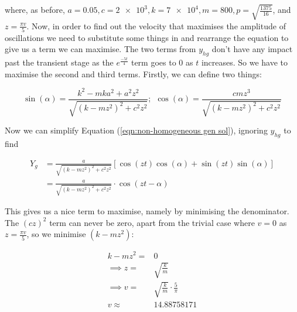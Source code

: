 \documentclass[12pt]{article}
\begin{document}
\begin{enumerate}
        where, as before, $a=0.05, c=\num{2e3}, k=\num{7e4}, m=800, p=\sqrt{\frac{1375}{16}}$, and 
        $z=\frac{\pi v}{5}$.
        \newline
        Now, in order to find out the velocity that maximises the amplitude of oscillations we need to 
        substitute some things in and rearrange the equation to give us a term we can maximise. 
        The two terms from $y_{hg}$ don't have any impact past the transient stage as the 
        $e^{\frac{-5t}{4}}$ term goes to 0 as $t$ increases. So we have to maximise the second and 
        third terms. Firstly, we can define two things:

        \begin{equation*}
            \sin(\alpha) = \frac{k^2-mka^2+a^2z^2}{\sqrt{(k-mz^2)^2+c^2z^2}};\hspace{5pt} \cos(\alpha) = \frac{cmz^3}{\sqrt{(k-mz^2)^2+c^2z^2}}
        \end{equation*}
        
        Now we can simplify Equation (\ref{eqn:non-homogeneous gen sol}), ignoring $y_{hg}$ to find

        \begin{equation}
            \begin{split}
                Y_g &= \frac{a}{\sqrt{(k-mz^2)^2+c^2z^2}}\left[\cos(zt)\cos(\alpha)+\sin(zt)\sin(\alpha)\right] \\
                &= \frac{a}{\sqrt{(k-mz^2)^2+c^2z^2}}\cdot\cos(zt-\alpha)
            \end{split}
            \label{eqn:max amplitude soln}
        \end{equation}

        This gives us a nice term to maximise, namely by minimising the denominator. The $(cz)^2$ 
        term can never be zero, apart from the trivial case where $v=0$ as $z=\frac{\pi v}{5}$, so 
        we minimise $(k-mz^2)$:

        \begin{equation*}
            \begin{split}
                k-mz^2=&0 \\
                \implies z=&\sqrt{\frac{k}{m}} \\
                \implies v=&\sqrt{\frac{k}{m}}\cdot\frac{5}{\pi} \\
                v\approx&14.88758171
            \end{split}
        \end{equation*}


\end{enumerate}
\end{document}
